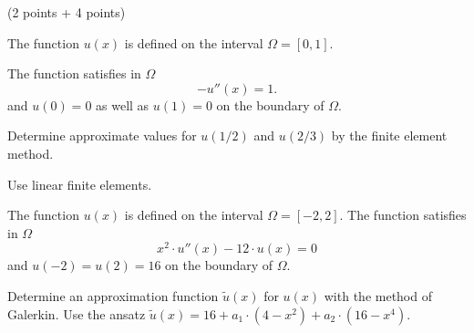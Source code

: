 (2 points + 4 points)
\begin{teilaufgaben}
\item
The function $u(x)$ is defined on the interval $\Omega = [0, 1].$

The function satisfies in $\Omega$ 
\[
-u''(x) = 1.
\]
and $u(0) = 0$ as well as $u(1) = 0$ on the boundary of $\Omega$.  

Determine approximate values for $u(1/2)$ and $u(2/3)$ by the finite
element method. 

Use linear finite elements.

\item
The function $u(x)$ is defined on the interval $\Omega = [-2, 2].$
The function satisfies in $\Omega$ 
\[
x^2 \cdot u''(x) - 12 \cdot u(x) = 0
\]
and $u(-2) = u(2) = 16$ on the boundary of $\Omega$.  

Determine an approximation function $\tilde u(x)$ for $u(x)$ with the
method of Galerkin.
Use the ansatz
$\tilde u(x) = 16 + a_1 \cdot (4 - x^2) + a_2 \cdot (16 - x^4).$
\end{teilaufgaben}

